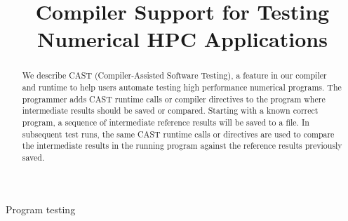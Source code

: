 \documentclass[conference]{IEEEtran}
\begin{document}
\title{Compiler Support for Testing Numerical HPC Applications}
%
%
\author{
\and
{}
}
%
%
%
\maketitle              %

\begin{abstract}
We describe CAST (Compiler-Assisted Software Testing), a feature in our compiler and runtime to help users automate testing high performance numerical programs.
The programmer adds CAST runtime calls or compiler directives to the program where intermediate results should be saved or compared.
Starting with a known correct program, a sequence of intermediate reference results will be saved to a file.
In subsequent test runs, the same CAST runtime calls or directives are used to compare the intermediate results in the running program against the reference results previously saved.
\end{abstract}
\begin{IEEEkeywords}
Program testing
\end{IEEEkeywords}
%








%


\end{document}
